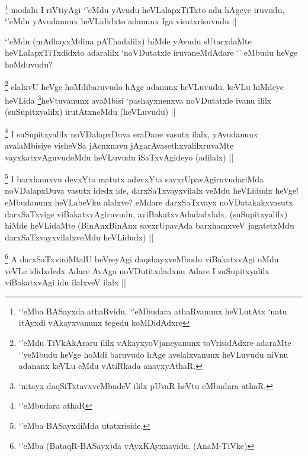 
\begin{artha}
\footnote{`\stext'eMba BASayxda athaRvidu. `\stext'eMbudara athaRvanunx heVLutAtx `natu itAyxdi vAkayxvanunx tegedu koMDidAdxre}
modalu I riVtiyAgi `\stext'eMdu yAvudu heVLalapxTiTxto adu hAgeye iruvudu, `\stext'eMdu yAvudanunx heVLididxto adanunx Iga visatxrisuvudu ||
\end{artha}

\begin{artha}
`\stext'eMdu (mAdhayxMdina pAThadalilx) hiMde yAvudu sUtarxdaMte heVLalapxTiTxdidxto adaralilx `noVDutatxle iruvaneMdAdare `\stext' eMbudu heVge hoMduvudu?
\end{artha}

\begin{artha}
\footnote{`\stext'eMdu TiVkAkAraru ililx vAkayxyoVjaneyanunx toVrisidAdxre adaraMte `\stext'yeMbudu heVge hoMdi baruvudo hAge avelalxvanunx heVLuvudu niVnu adananx keVLu eMdu vAtiRkada anavxyAthaR.}
elalxvU heVge hoMdibaruvudo hAge adanunx heVLuvudu. keVLu hiMdeye heVLida \footnote{`nitayx daqSiTxtavxveMbudeV ililx pUvaR heVtu eMbudara athaR,}heVtuvanunx avaMbisi `pashayxnenxva noVDutatxle ivanu ililx (suSupitxyalilx) irutAtxneMdu (heVLuvudu) ||
\end{artha}


\begin{artha}
\footnote{`\stext'eMbudara athaR}
I suSupitxyalilx noVDalapxDuva eraDane vasutx ilalx, yAvudanunx avalaMbisiye visheVSa jAcnxnavu jAgarAvasethxyalilxruvaMte vayxkatxvAguvudeMdu heVLuvudu iSaTxvAgideyo (adilalx) ||
\end{artha}


\begin{artha}
\footnote{`\stext'eMba BASayxdiMda utatxriside.}
I barxhamxvu devxYta matutx adevxYta savxrUpavAgiruvudariMda noVDalapxDuva vasutx idedx ide, darxSaTxvayxvilalx veMdu heVLidudx heVge! eMbudanunx heVLabeVku alalxve? eMdare darxSaTxvayx noVDatakakxvasutx darxSaTxvige viBakatxvAgiruvudu, aviBakatxvAdadadxlalx, (suSupitxyalilx) hiMde heVLidaMte (BinAnxBinAnx savxrUpavAda barxhamxveV jagatetxMdu darxSaTxvayxvilalxveMdu heVLidudx) ||
\end{artha}

\begin{artha}
\footnote{`\stext'eMba (BataqR-BASayx)da vAyxKAyxnavidu. (AnaM-TiVke)}
A darxSaTxviniMtalU beVreyAgi daqshayxveMbudu viBakatxvAgi oMdu veVLe ididxdedx Adare AvAga noVDutitxdadxnu Adare I suSupitxyalilx viBakatxvAgi idu ilalxveV ilalx ||
\end{artha}

